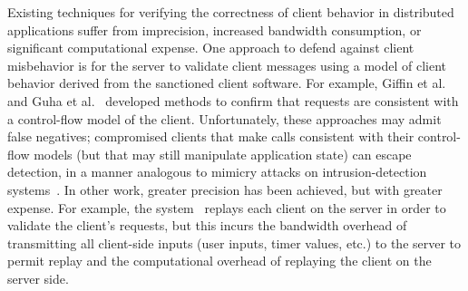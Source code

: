 Existing techniques for verifying the correctness of client behavior
in distributed applications suffer from imprecision, increased
bandwidth consumption, or significant computational expense. One
approach to defend against client misbehavior is for the server to
validate client messages using a model of client behavior derived from
the sanctioned client software.  For example, Giffin et
al.~\cite{giffin02:remote} and Guha et al.~\cite{guha09:ajax}
developed methods to confirm that requests are consistent with a
control-flow model of the client.  Unfortunately, these approaches may
admit false negatives; compromised clients that make calls consistent
with their control-flow models (but that may still manipulate
application state) can escape detection, in a manner analogous to
mimicry attacks on intrusion-detection
systems~\cite{wagner02:mimicry,tan03:hiding}. In other work, greater
precision has been achieved, but with greater expense.  For example,
the \ripley system~\cite{vikram09:ripley} replays each client on the
server in order to validate the client's requests, but this incurs the
bandwidth overhead of transmitting all client-side inputs (user
inputs, timer values, etc.) to the server to permit replay and the
computational overhead of replaying the client on the server side. 

%

